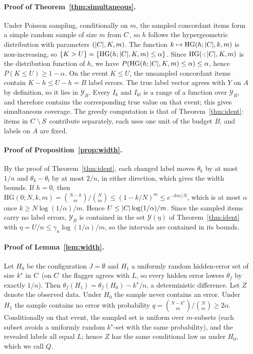 \paragraph{Proof of Theorem~\ref{thm:simultaneous}.} Under Poisson sampling, conditionally on $m$, the sampled concordant items form a simple random sample of size $m$ from $C$, so $h$ follows the hypergeometric distribution with parameters $(|C|,K,m)$. The function $k\mapsto\mathrm{HG}(h;|C|,k,m)$ is non-increasing, so $\{K>U\}=\{\mathrm{HG}(h;|C|,K,m)\le\alpha\}$. Since $\mathrm{HG}(\cdot;|C|,K,m)$ is the distribution function of $h$, we have $P(\mathrm{HG}(h;|C|,K,m)\le\alpha)\le\alpha$, hence $P(K\le U)\ge1-\alpha$. On the event $K\le U$, the unsampled concordant items contain $K-h\le U-h=B$ label errors. The true label vector agrees with $Y$ on $A$ by definition, so it lies in $\mathcal Y_B$. Every $I_k$ and $I_{kl}$ is a range of a function over $\mathcal Y_B$, and therefore contains the corresponding true value on that event; this gives simultaneous coverage. The greedy computation is that of Theorem~\ref{thm:ident}: items in $C\setminus S$ contribute separately, each uses one unit of the budget $B$, and labels on $A$ are fixed. \hfill\BlackBox

\paragraph{Proof of Proposition~\ref{prop:width}.} By the proof of Theorem~\ref{thm:ident}, each changed label moves $\theta_k$ by at most $1/n$ and $\theta_k-\theta_l$ by at most $2/n$, in either direction, which gives the width bounds. If $h=0$, then $\mathrm{HG}(0;N,k,m)=\binom{N-k}{m}/\binom{N}{m}\le(1-k/N)^m\le e^{-km/N}$, which is at most $\alpha$ once $k\ge N\log(1/\alpha)/m$. Hence $U\le|C|\log(1/\alpha)/m$. Since the sampled items carry no label errors, $\mathcal Y_B$ is contained in the set $\mathcal Y(\eta)$ of Theorem~\ref{thm:ident} with $\eta=U/n\le\gamma_n\log(1/\alpha)/m$, so the intervals are contained in its bounds. \hfill\BlackBox

\paragraph{Proof of Lemma~\ref{lem:width}.} Let $H_0$ be the configuration $J=\emptyset$ and $H_1$ a uniformly random hidden-error set of size $k^\star$ in $C$ (on $C$ the flagger agrees with $L$, so every hidden error lowers $\theta_f$ by exactly $1/n$). Then $\theta_f(H_1)=\theta_f(H_0)-k^\star/n$, a deterministic difference. Let $Z$ denote the observed data. Under $H_0$ the sample never contains an error. Under $H_1$ the sample contains no error with probability $q=\binom{N-k^\star}{m}/\binom Nm\ge2\alpha$. Conditionally on that event, the sampled set is uniform over $m$-subsets (each subset avoids a uniformly random $k^\star$-set with the same probability), and the revealed labels all equal $L$; hence $Z$ has the same conditional law as under $H_0$, which we call $Q$.

